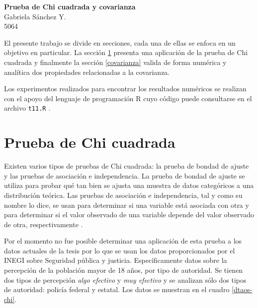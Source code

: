 \documentclass[12pt]{article}
\begin{document}
	\thispagestyle{empty}

	\begin{center}
		{\Large \bf Prueba de Chi cuadrada y covarianza}\\
		Gabriela S\'anchez Y.\\
		5064
	\end{center}
  
  	El presente trabajo se divide en secciones, cada una de ellas se enfoca en un objetivo en particular. %
  	La sección \ref{pchi} presenta una aplicación de la prueba de Chi cuadrada y finalmente la sección \ref{covarianza} valida de forma numérica y analítica dos propiedades relacionadas a la covarianza.
  	
  	Los experimentos realizados para encontrar los resultados numéricos se realizan con el apoyo del lenguaje de programación \textsc{R} \cite{rstatistics} cuyo código puede consultarse en el archivo \texttt{t11.R} \cite{mpa_gaby}.
  	
	
	
	\section{Prueba de Chi cuadrada} \label{pchi}
	
	Existen varios tipos de pruebas de Chi cuadrada: la prueba de bondad de ajuste y las pruebas de asociación e independencia. La prueba de bondad de ajuste se utiliza para probar qué tan bien se ajusta una muestra de datos categóricos a una distribución teórica. Las pruebas de asociación e independencia, tal y como su nombre lo dice, se usan para determinar si una variable está asociada con otra y para determinar si el valor observado de una variable depende del valor observado de otra, respectivamente \cite{minitab}.
	
	Por el momento no fue posible determinar una aplicación de esta prueba a los datos actuales de la tesis por lo que se usan los datos proporcionados por el INEGI \cite{inegi} sobre Seguridad pública y justicia. Específicamente datos sobre la percepción de la población mayor de 18 años, por tipo de autoridad. Se tienen dos tipos de percepción {\em algo efectivo} y {\em muy efectivo} y se analizan sólo dos tipos de autoridad: policía federal y estatal. Los datos se muestran en el cuadro \ref{dtaos-chi}.
	
\end{document}
